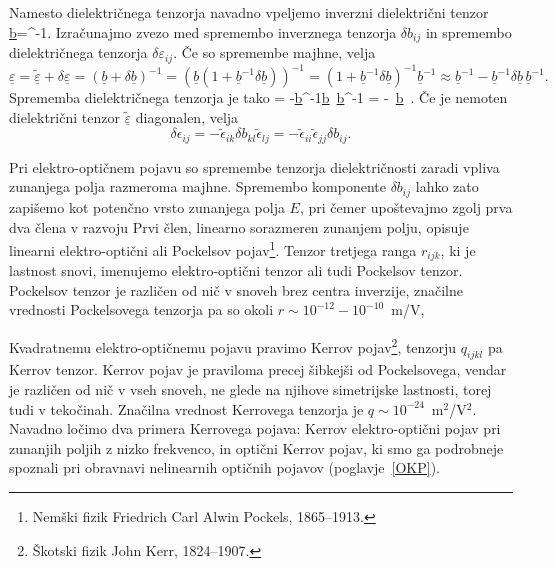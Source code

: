 Namesto dielektričnega tenzorja 
navadno vpeljemo inverzni dielektrični tenzor
\beq
\underline{b}=\underline{\epsilon}^{-1}.
\eeq
Izračunajmo zvezo med spremembo inverznega tenzorja $\delta b_{ij}$ 
in spremembo dielektričnega tenzorja $\delta \varepsilon_{ij}$. 
Če so spremembe majhne, velja 
\begin{equation}
\underline{\varepsilon} = \underline{\tilde{\varepsilon}} + \delta \underline{\varepsilon}=
(\underline{b}+\delta \underline{b})^{-1}=\left(\underline{b}(1+\underline{b}^{-1}
\delta \underline{b})\right)^{-1}=(1+\underline{b}^{-1}\delta \underline{b})^{-1}\underline{b}^{-1}
\approx \underline{b}^{-1}-\underline{b}^{-1}\delta \underline{b}\, \underline{b}^{-1}.
\label{7.2}
\end{equation}
Sprememba dielektričnega tenzorja je tako
\beq
 \delta \underline{\varepsilon}= -\underline{b}^{-1}\delta \underline{b}\, \underline{b}^{-1}
 = -\underline{\tilde{\varepsilon}}\, \delta \underline{b}\, \underline{\tilde{\varepsilon}}.
\eeq
Če je nemoten dielektrični tenzor $\underline{\tilde{\varepsilon}}$ diagonalen, velja
\begin{equation}
\delta\epsilon_{ij}=-\tilde{\epsilon}_{ik}\delta b_{kl}\tilde{\epsilon}_{lj}
=-\tilde{\epsilon}_{ii}\tilde{\epsilon}_{jj}\delta b_{ij}.
\label{7.3}
\end{equation}

Pri elektro-optičnem pojavu so spremembe tenzorja dielektričnosti zaradi vpliva zunanjega polja razmeroma 
majhne. Spremembo komponente $\delta b_{ij}$ lahko zato zapišemo kot potenčno vrsto zunanjega polja $E$, 
pri čemer upoštevajmo zgolj prva dva člena v razvoju
Prvi člen, linearno sorazmeren zunanjem polju, opisuje linearni elektro-optični
ali Pockelsov pojav\footnote{Nemški fizik Friedrich Carl Alwin Pockels, 1865--1913.}. 
Tenzor tretjega ranga $r_{ijk}$, ki je lastnost snovi, imenujemo elektro-optični 
tenzor
ali tudi Pockelsov tenzor. 
Pockelsov tenzor je različen od nič v snoveh brez centra inverzije, značilne vrednosti Pockelsovega
tenzorja pa so okoli $r \sim 10^{-12} - 10^{-10}$~m/V,

Kvadratnemu elektro-optičnemu pojavu pravimo Kerrov
pojav\footnote{Škotski fizik John Kerr, 1824--1907.}, tenzorju $q_{ijkl}$ pa Kerrov tenzor. 
Kerrov pojav je praviloma precej šibkejši od Pockelsovega, vendar je različen od nič v vseh snoveh, ne glede na
njihove simetrijske lastnosti, torej tudi v tekočinah. 
Značilna vrednost Kerrovega tenzorja je $q \sim 10^{-24}$~m$^2$/V$^2$. Navadno ločimo dva primera Kerrovega
pojava: Kerrov elektro-optični pojav pri zunanjih poljih z nizko frekvenco, in optični Kerrov pojav, ki smo 
ga podrobneje spoznali pri obravnavi nelinearnih optičnih pojavov (poglavje~\ref{OKP}).

